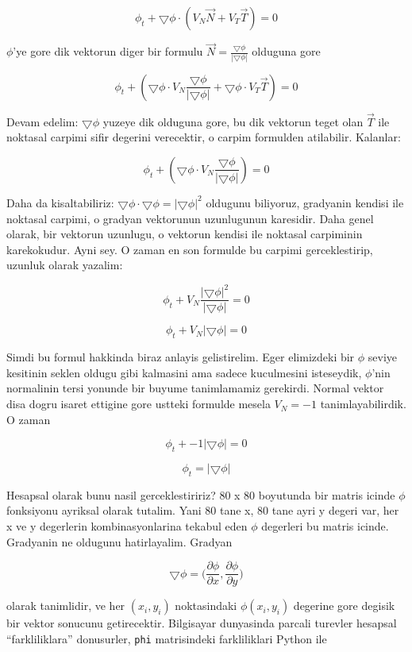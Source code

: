 \documentclass[12pt,fleqn]{article}\usepackage{../common}
\begin{document}
$$ \phi_t + \bigtriangledown \phi \cdot (V_N\vec{N} + V_T\vec{T}) = 0 $$

$\phi$'ye gore dik vektorun diger bir formulu $\vec{N} =
\frac{\bigtriangledown\phi}{|\bigtriangledown\phi|}$ olduguna gore

$$ \phi_t + (\bigtriangledown \phi \cdot
V_N\frac{\bigtriangledown\phi}{|\bigtriangledown\phi|} + \bigtriangledown
\phi \cdot V_T\vec{T}) = 0 $$

Devam edelim: $\bigtriangledown \phi$ yuzeye dik olduguna gore, bu dik vektorun
teget olan $\vec{T}$ ile noktasal carpimi sifir degerini verecektir, o carpim
formulden atilabilir. Kalanlar:

$$ \phi_t + (\bigtriangledown \phi \cdot 
V_N\frac{\bigtriangledown\phi}{|\bigtriangledown\phi|}) = 0 $$

Daha da kisaltabiliriz: $\bigtriangledown \phi \cdot \bigtriangledown
\phi = |\bigtriangledown \phi|^2$ oldugunu biliyoruz, gradyanin
kendisi ile noktasal carpimi, o gradyan vektorunun uzunlugunun
karesidir. Daha genel olarak, bir vektorun uzunlugu, o vektorun
kendisi ile noktasal carpiminin karekokudur. Ayni sey. O zaman en son
formulde bu carpimi gerceklestirip, uzunluk olarak yazalim:

$$ \phi_t + V_N\frac{|\bigtriangledown\phi|^2}{|\bigtriangledown\phi|} = 0  $$

$$ \phi_t + V_N |\bigtriangledown\phi| = 0  $$

Simdi bu formul hakkinda biraz anlayis gelistirelim. Eger elimizdeki
bir $\phi$ seviye kesitinin seklen oldugu gibi kalmasini ama sadece
kuculmesini isteseydik, $\phi$'nin normalinin tersi yonunde bir buyume
tanimlamamiz gerekirdi. Normal vektor disa dogru isaret ettigine gore
ustteki formulde mesela $V_N = -1$ tanimlayabilirdik. O zaman

$$ \phi_t + -1 |\bigtriangledown\phi| = 0 $$

$$ \phi_t = |\bigtriangledown\phi|   $$

Hesapsal olarak bunu nasil gerceklestiririz? 80 x 80 boyutunda bir
matris icinde $\phi$ fonksiyonu ayriksal olarak tutalim. Yani 80 tane
x, 80 tane ayri y degeri var, her x ve y degerlerin kombinasyonlarina
tekabul eden $\phi$ degerleri bu matris icinde. Gradyanin ne oldugunu
hatirlayalim. Gradyan

$$ 
\bigtriangledown \phi = \bigg(
\frac{\partial \phi}{\partial x},
\frac{\partial \phi}{\partial y} \bigg)
$$

olarak tanimlidir, ve her $(x_i,y_i)$ noktasindaki $\phi(x_i,y_i)$
degerine gore degisik bir vektor sonucunu getirecektir. Bilgisayar
dunyasinda parcali turevler hesapsal ``farkliliklara'' donusurler,
\verb!phi! matrisindeki farkliliklari Python ile
\end{document}
